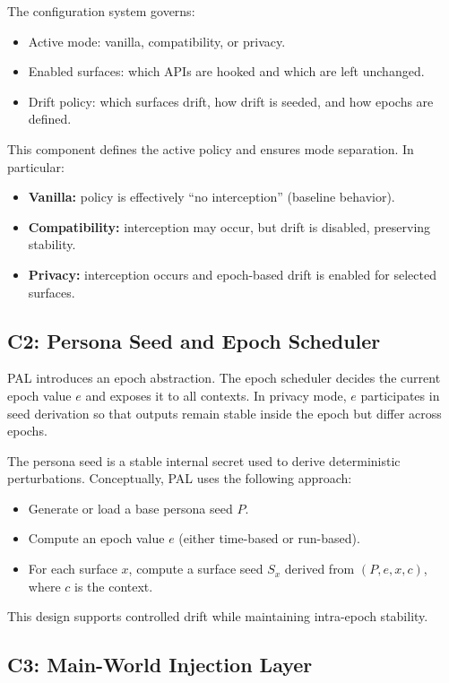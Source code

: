 \documentclass[11pt]{report}
\begin{document}
The configuration system governs:
\begin{itemize}
    \item Active mode: vanilla, compatibility, or privacy.
    \item Enabled surfaces: which APIs are hooked and which are left unchanged.
    \item Drift policy: which surfaces drift, how drift is seeded, and how epochs are defined.
\end{itemize}

This component defines the active policy and ensures mode separation. In particular:
\begin{itemize}
    \item \textbf{Vanilla:} policy is effectively ``no interception'' (baseline behavior).
    \item \textbf{Compatibility:} interception may occur, but drift is disabled, preserving stability.
    \item \textbf{Privacy:} interception occurs and epoch-based drift is enabled for selected surfaces.
\end{itemize}

\subsection{C2: Persona Seed and Epoch Scheduler}

PAL introduces an epoch abstraction. The epoch scheduler decides the current epoch value $e$ and exposes it to all contexts. In privacy mode, $e$ participates in seed derivation so that outputs remain stable inside the epoch but differ across epochs.

The persona seed is a stable internal secret used to derive deterministic perturbations. Conceptually, PAL uses the following approach:
\begin{itemize}
    \item Generate or load a base persona seed $P$.
    \item Compute an epoch value $e$ (either time-based or run-based).
    \item For each surface $x$, compute a surface seed $S_x$ derived from $(P, e, x, c)$, where $c$ is the context.
\end{itemize}

This design supports controlled drift while maintaining intra-epoch stability.

\subsection{C3: Main-World Injection Layer}
\end{document}
